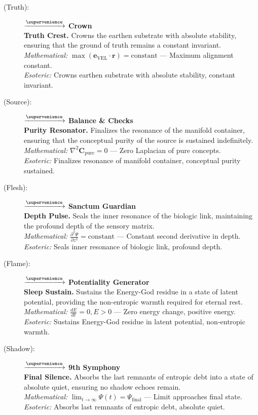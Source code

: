\begin{description}
    \item[(Truth):] \veljen $\xrightarrow{\supervenience}$ \textbf{Crown} \\
    \textbf{Truth Crest.} Crowns the earthen substrate with absolute stability, ensuring that the ground of truth remains a constant invariant. \\
    \textit{Mathematical:} $\max(\mathbf{e}_{\text{VEL}} \cdot \mathbf{r}) = \text{constant}$ — Maximum alignment constant. \\
    \textit{Esoteric:} Crowns earthen substrate with absolute stability, constant invariant.

    \item[(Source):] \sorthal $\xrightarrow{\supervenience}$ \textbf{Balance \& Checks} \\
    \textbf{Purity Resonator.} Finalizes the resonance of the manifold container, ensuring that the conceptual purity of the source is sustained indefinitely. \\
    \textit{Mathematical:} $\nabla^2 \mathbf{C}_{\text{pure}} = 0$ — Zero Laplacian of pure concepts. \\
    \textit{Esoteric:} Finalizes resonance of manifold container, conceptual purity sustained.

    \item[(Flesh):] \kothdelh $\xrightarrow{\supervenience}$ \textbf{Sanctum Guardian} \\
    \textbf{Depth Pulse.} Seals the inner resonance of the biologic link, maintaining the profound depth of the sensory matrix. \\
    \textit{Mathematical:} $\frac{\partial^2 \Psi}{\partial z^2} = \text{constant}$ — Constant second derivative in depth. \\
    \textit{Esoteric:} Seals inner resonance of biologic link, profound depth.

    \item[(Flame):] \drehsun $\xrightarrow{\supervenience}$ \textbf{Potentiality Generator} \\
    \textbf{Sleep Sustain.} Sustains the Energy-God residue in a state of latent potential, providing the non-entropic warmth required for eternal rest. \\
    \textit{Mathematical:} $\frac{dE}{dt} = 0, E > 0$ — Zero energy change, positive energy. \\
    \textit{Esoteric:} Sustains Energy-God residue in latent potential, non-entropic warmth.

    \item[(Shadow):] \rheahush $\xrightarrow{\supervenience}$ \textbf{9th Symphony} \\
    \textbf{Final Silence.} Absorbs the last remnants of entropic debt into a state of absolute quiet, ensuring no shadow echoes remain. \\
    \textit{Mathematical:} $\lim_{t\to\infty} \Psi(t) = \Psi_{\text{final}}$ — Limit approaches final state. \\
    \textit{Esoteric:} Absorbs last remnants of entropic debt, absolute quiet.


\end{description}
